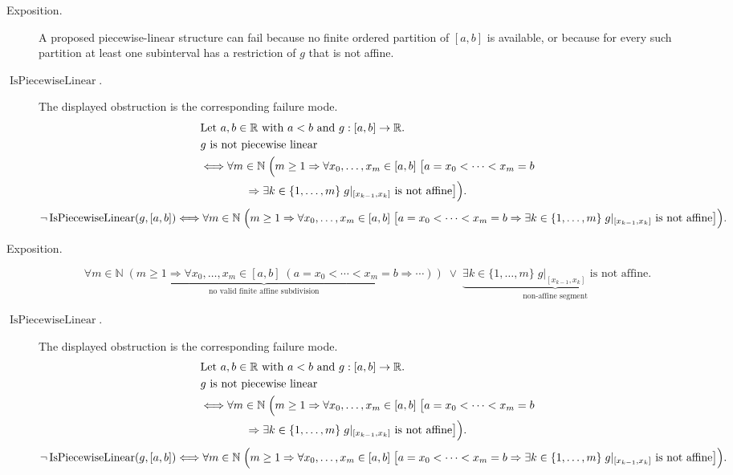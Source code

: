 \begin{remark*}
\begin{description}
  \item[Exposition.]
A proposed piecewise-linear structure can fail because no finite ordered
partition of $[a,b]$ is available, or because for every such partition
at least one subinterval has a restriction of $g$ that is not affine.


  \item[\(\operatorname{IsPiecewiseLinear}.\)]
  The displayed obstruction is the corresponding failure mode.
  \[
\begin{aligned}
&\text{Let } a,b \in \mathbb{R} \text{ with } a<b \text{ and } g:[a,b]\to\mathbb{R}.\\
&g \text{ is not piecewise linear}\\
&\Longleftrightarrow
\forall m \in \mathbb{N}\;\Bigl(m \ge 1 \Rightarrow
\forall x_0,\ldots,x_m \in [a,b]\;
\bigl[a=x_0 < \cdots < x_m = b\\
&\qquad\qquad\Rightarrow
\exists k \in \{1,\ldots,m\}\; g|_{[x_{k-1},x_k]} \text{ is not affine}\bigr]\Bigr).
\end{aligned}
  \]
  \[
\neg\operatorname{IsPiecewiseLinear}(g,[a,b])
\Longleftrightarrow
\forall m \in \mathbb{N}\;\Bigl(m \ge 1 \Rightarrow
\forall x_0,\ldots,x_m \in [a,b]\;
\bigl[a=x_0 < \cdots < x_m = b
\Rightarrow
\exists k \in \{1,\ldots,m\}\; g|_{[x_{k-1},x_k]} \text{ is not affine}\bigr]\Bigr).
  \]
\end{description}
\end{remark*}

\begin{remark*}
\begin{description}
  \item[Exposition.]
\[
\underbrace{\forall m\in\mathbb{N}\;(m\ge 1\Rightarrow
\forall x_0,\ldots,x_m\in[a,b]\;(a=x_0<\cdots<x_m=b\Rightarrow\cdots))}_{\text{no valid finite affine subdivision}}
\;\lor\;
\underbrace{\exists k\in\{1,\ldots,m\}\; g|_{[x_{k-1},x_k]}\text{ is not affine}}_{\text{non-affine segment}}.
\]


  \item[\(\operatorname{IsPiecewiseLinear}.\)]
  The displayed obstruction is the corresponding failure mode.
  \[
\begin{aligned}
&\text{Let } a,b \in \mathbb{R} \text{ with } a<b \text{ and } g:[a,b]\to\mathbb{R}.\\
&g \text{ is not piecewise linear}\\
&\Longleftrightarrow
\forall m \in \mathbb{N}\;\Bigl(m \ge 1 \Rightarrow
\forall x_0,\ldots,x_m \in [a,b]\;
\bigl[a=x_0 < \cdots < x_m = b\\
&\qquad\qquad\Rightarrow
\exists k \in \{1,\ldots,m\}\; g|_{[x_{k-1},x_k]} \text{ is not affine}\bigr]\Bigr).
\end{aligned}
  \]
  \[
\neg\operatorname{IsPiecewiseLinear}(g,[a,b])
\Longleftrightarrow
\forall m \in \mathbb{N}\;\Bigl(m \ge 1 \Rightarrow
\forall x_0,\ldots,x_m \in [a,b]\;
\bigl[a=x_0 < \cdots < x_m = b
\Rightarrow
\exists k \in \{1,\ldots,m\}\; g|_{[x_{k-1},x_k]} \text{ is not affine}\bigr]\Bigr).
  \]
\end{description}
\end{remark*}

